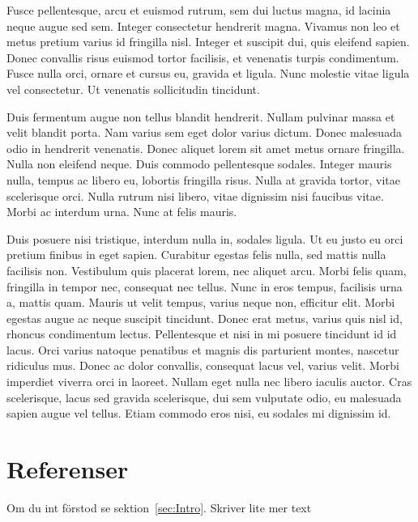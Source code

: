 \documentclass[a4paper,10pt]{article}
\begin{document}
Fusce pellentesque, arcu et euismod rutrum, sem dui luctus magna, id lacinia neque augue sed sem. Integer consectetur hendrerit magna. Vivamus non leo et metus pretium varius id fringilla nisl. Integer et suscipit dui, quis eleifend sapien. Donec convallis risus euismod tortor facilisis, et venenatis turpis condimentum. Fusce nulla orci, ornare et cursus eu, gravida et ligula. Nunc molestie vitae ligula vel consectetur. Ut venenatis sollicitudin tincidunt.

Duis fermentum augue non tellus blandit hendrerit. Nullam pulvinar massa et velit blandit porta. Nam varius sem eget dolor varius dictum. Donec malesuada odio in hendrerit venenatis. Donec aliquet lorem sit amet metus ornare fringilla. Nulla non eleifend neque. Duis commodo pellentesque sodales. Integer mauris nulla, tempus ac libero eu, lobortis fringilla risus. Nulla at gravida tortor, vitae scelerisque orci. Nulla rutrum nisi libero, vitae dignissim nisi faucibus vitae. Morbi ac interdum urna. Nunc at felis mauris.

Duis posuere nisi tristique, interdum nulla in, sodales ligula. Ut eu justo eu orci pretium finibus in eget sapien. Curabitur egestas felis nulla, sed mattis nulla facilisis non. Vestibulum quis placerat lorem, nec aliquet arcu. Morbi felis quam, fringilla in tempor nec, consequat nec tellus. Nunc in eros tempus, facilisis urna a, mattis quam. Mauris ut velit tempus, varius neque non, efficitur elit. Morbi egestas augue ac neque suscipit tincidunt. Donec erat metus, varius quis nisl id, rhoncus condimentum lectus. Pellentesque et nisi in mi posuere tincidunt id id lacus. Orci varius natoque penatibus et magnis dis parturient montes, nascetur ridiculus mus. Donec ac dolor convallis, consequat lacus vel, varius velit. Morbi imperdiet viverra orci in laoreet. Nullam eget nulla nec libero iaculis auctor. Cras scelerisque, lacus sed gravida scelerisque, dui sem vulputate odio, eu malesuada sapien augue vel tellus. Etiam commodo eros nisi, eu sodales mi dignissim id.

\section{Referenser}
Om du int förstod se sektion~\ref{sec:Intro}.
Skriver lite mer text
\end{document}
